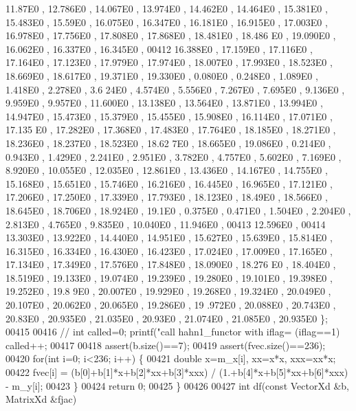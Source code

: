 \begin{DoxyCode}
      11.87E0  , 12.786E0 , 14.067E0 , 13.974E0 , 14.462E0 , 14.464E0 , 15.381E0 , 15.483E0 , 15.59E0  , 16.075E0 
      , 16.347E0 , 16.181E0 , 16.915E0 , 17.003E0 , 16.978E0 , 17.756E0 , 17.808E0 , 17.868E0 , 18.481E0 , 18.486
      E0 , 19.090E0 , 16.062E0 , 16.337E0 , 16.345E0 ,
00412         16.388E0 , 17.159E0 , 17.116E0 , 17.164E0 , 17.123E0 , 17.979E0 , 17.974E0 , 18.007E0 , 17.993E0 , 
      18.523E0 , 18.669E0 , 18.617E0 , 19.371E0 , 19.330E0 , 0.080E0 , 0.248E0 , 1.089E0 , 1.418E0 , 2.278E0 , 3.6
      24E0 , 4.574E0 , 5.556E0 , 7.267E0 , 7.695E0 , 9.136E0 , 9.959E0 , 9.957E0 , 11.600E0 , 13.138E0 , 13.564E0 
      , 13.871E0 , 13.994E0 , 14.947E0 , 15.473E0 , 15.379E0 , 15.455E0 , 15.908E0 , 16.114E0 , 17.071E0 , 17.135
      E0 , 17.282E0 , 17.368E0 , 17.483E0 , 17.764E0 , 18.185E0 , 18.271E0 , 18.236E0 , 18.237E0 , 18.523E0 , 18.62
      7E0 , 18.665E0 , 19.086E0 , 0.214E0 , 0.943E0 , 1.429E0 , 2.241E0 , 2.951E0 , 3.782E0 , 4.757E0 , 5.602E0 , 
      7.169E0 , 8.920E0 , 10.055E0 , 12.035E0 , 12.861E0 , 13.436E0 , 14.167E0 , 14.755E0 , 15.168E0 , 15.651E0 , 
      15.746E0 , 16.216E0 , 16.445E0 , 16.965E0 , 17.121E0 , 17.206E0 , 17.250E0 , 17.339E0 , 17.793E0 , 18.123E0 
      , 18.49E0  , 18.566E0 , 18.645E0 , 18.706E0 , 18.924E0 , 19.1E0   , 0.375E0 , 0.471E0 , 1.504E0 , 2.204E0 , 
      2.813E0 , 4.765E0 , 9.835E0 , 10.040E0 , 11.946E0 , 
00413 12.596E0 , 
00414 13.303E0 , 13.922E0 , 14.440E0 , 14.951E0 , 15.627E0 , 15.639E0 , 15.814E0 , 16.315E0 , 16.334E0 , 16.430E0
       , 16.423E0 , 17.024E0 , 17.009E0 , 17.165E0 , 17.134E0 , 17.349E0 , 17.576E0 , 17.848E0 , 18.090E0 , 18.276
      E0 , 18.404E0 , 18.519E0 , 19.133E0 , 19.074E0 , 19.239E0 , 19.280E0 , 19.101E0 , 19.398E0 , 19.252E0 , 19.8
      9E0  , 20.007E0 , 19.929E0 , 19.268E0 , 19.324E0 , 20.049E0 , 20.107E0 , 20.062E0 , 20.065E0 , 19.286E0 , 19
      .972E0 , 20.088E0 , 20.743E0 , 20.83E0  , 20.935E0 , 21.035E0 , 20.93E0  , 21.074E0 , 21.085E0 , 20.935E0 \};
00415 
00416         \textcolor{comment}{//        int called=0; printf("call hahn1\_functor with  iflag=%
       (iflag==1) called++;}
00417 
00418         assert(b.size()==7);
00419         assert(fvec.size()==236);
00420         \textcolor{keywordflow}{for}(\textcolor{keywordtype}{int} i=0; i<236; i++) \{
00421             \textcolor{keywordtype}{double} x=m\_x[i], xx=x*x, xxx=xx*x;
00422             fvec[i] = (b[0]+b[1]*x+b[2]*xx+b[3]*xxx) / (1.+b[4]*x+b[5]*xx+b[6]*xxx) - m\_y[i];
00423         \}
00424         \textcolor{keywordflow}{return} 0;
00425     \}
00426 
00427     \textcolor{keywordtype}{int} df(\textcolor{keyword}{const} VectorXd &b, MatrixXd &fjac)

\end{DoxyCode}
